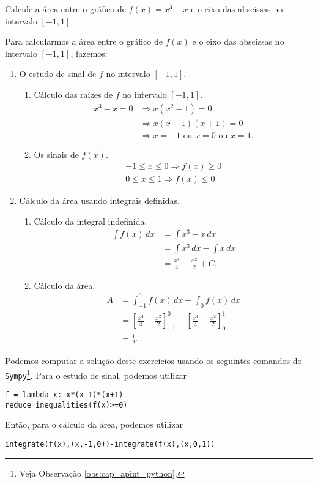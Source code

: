\begin{exeresol}
  Calcule a área entre o gráfico de $f(x) = x^3-x$ e o eixo das abscissas no intervalo $[-1,1]$.
\end{exeresol}
\begin{resol}
  Para calcularmos a área entre o gráfico de $f(x)$ e o eixo das abscissas no intervalo $[-1,1]$, fazemos:
  \begin{enumerate}[1.]
  \item O estudo de sinal de $f$ no intervalo $[-1,1]$.
    \begin{enumerate}
    \item Cálculo das raízes de $f$ no intervalo $[-1,1]$.
      \begin{align}
        x^3-x=0 &\Rightarrow x(x^2-1)=0\\
                &\Rightarrow x(x-1)(x+1)=0\\
                &\Rightarrow x=-1\text{ ou }x=0\text{ ou }x=1.
      \end{align}
    \item Os sinais de $f(x)$.
      \begin{align}
        -1\leq x \leq 0 \Rightarrow f(x)\geq 0\\
        0\leq x \leq 1 \Rightarrow f(x)\leq 0.
      \end{align}
    \end{enumerate}
  \item Cálculo da área usando integrais definidas.
    \begin{enumerate}
    \item Cálculo da integral indefinida.
      \begin{align}
        \int f(x)\,dx &= \int x^3-x\,dx\\
                      &= \int x^3\,dx - \int x\,dx\\
                      &= \frac{x^4}{4} - \frac{x^2}{2} + C.
      \end{align}
    \item Cálculo da área.
    \begin{align}
      A &= \int_{-1}^0 f(x)\,dx - \int_{0}^{1} f(x)\,dx \\
        &= \left[\frac{x^4}{4} - \frac{x^2}{2}\right]_{-1}^0 - \left[\frac{x^4}{4} - \frac{x^2}{2}\right]_{0}^1\\
        &= \frac{1}{2}.
    \end{align}
    \end{enumerate}
  \end{enumerate}

  \ifispython
  Podemos computar a solução deste exercícios usando os seguintes comandos do \verb+Sympy+\footnote{Veja Observação \ref{obs:cap_apint_python}.}. Para o estudo de sinal, podemos utilizar
\begin{verbatim}
f = lambda x: x*(x-1)*(x+1)
reduce_inequalities(f(x)>=0)
\end{verbatim}
  Então, para o cálculo da área, podemos utilizar
\begin{verbatim}
integrate(f(x),(x,-1,0))-integrate(f(x),(x,0,1))
\end{verbatim}
  \fi
\end{resol}

